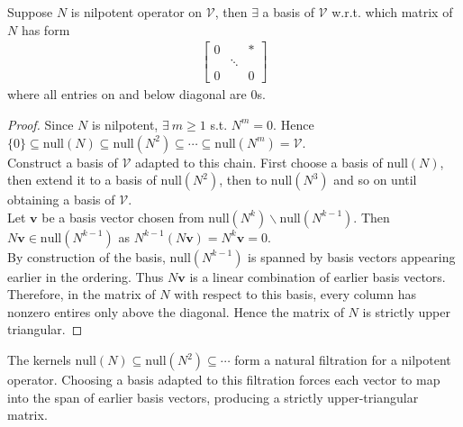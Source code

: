 \begin{lemma} \label{lem:nilpotentopstrictuptrigmatrix} Suppose $N$ is nilpotent operator on $\mathcal{V}$, then $\exists$ a basis of $\mathcal{V}$ w.r.t. which matrix of $N$ has form
\begin{align}
\begin{bmatrix}
0 & & *\\
& \ddots & \\
0 & & 0
\end{bmatrix} \nonumber
\end{align}
where all entries on and below diagonal are $0$s.
\begin{proof} Since $N$ is nilpotent, $\exists \ m \geq 1$ s.t. $N^m = 0$. Hence $\{ 0 \} \subseteq \text{null}(N)	 \subseteq \text{null}(N^2) \subseteq \cdots \subseteq \text{null}(N^m) = \mathcal{V}$.\\
Construct a basis of $\mathcal{V}$ adapted to this chain. First choose a basis of $\text{null}(N)$, then extend it to a basis of $\text{null}(N^2)$, then to $\text{null}(N^3)$ and so on until obtaining a basis of $\mathcal{V}$.\\
Let $\mathbf{v}$ be a basis vector chosen from $\text{null}(N^k) \backslash \text{null}(N^{k-1})$. Then $N \mathbf{v} \in \text{null}(N^{k-1})$ as $N^{k-1}(N \mathbf{v}) = N^k \mathbf{v} = 0$.\\
By construction of the basis, $\text{null}(N^{k-1})$ is spanned by basis vectors appearing earlier in the ordering. Thus $N \mathbf{v}$ is a linear combination of earlier basis vectors.\\
Therefore, in the matrix of $N$ with respect to this basis, every column has nonzero entires only above the diagonal. Hence the matrix of $N$ is strictly upper triangular.
\end{proof}
\end{lemma}

The kernels $\text{null}(N) \subseteq \text{null}(N^2) \subseteq \cdots$ form a natural filtration for a nilpotent operator. Choosing a basis adapted to this filtration forces each vector to map into the span of earlier basis vectors, producing a strictly upper-triangular matrix.

